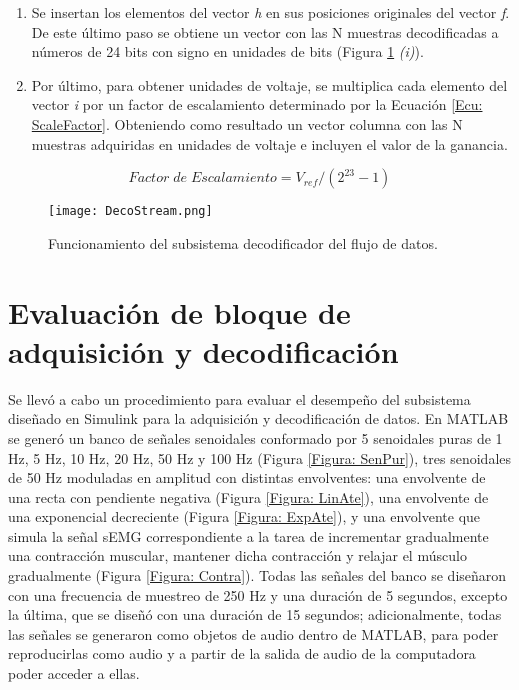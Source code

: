 \begin{enumerate}
	\item Se insertan los elementos del vector \emph{h} en sus posiciones originales del vector \emph{f}. De este último paso se obtiene un vector con las N muestras decodificadas a números de 24 bits con signo en unidades de bits (Figura \ref{Figura: DecoStream} \emph{(i)}).
	
	\item Por último, para  obtener unidades de voltaje, se multiplica cada elemento del vector \emph{i} por un factor de escalamiento determinado por la Ecuación \ref{Ecu: ScaleFactor}. Obteniendo como resultado un vector columna con las N muestras adquiridas en unidades de voltaje e incluyen el valor de la ganancia.
\end{enumerate}

\vfill
\begin{equation}
	Factor\; de\; Escalamiento = V_{ref}/(2^{23}-1)
	\label{Ecu: ScaleFactor}
\end{equation}
\vfill

\begin{figure}[htbb]
\centering
	\texttt{[image: DecoStream.png]}
	\caption{Funcionamiento del subsistema decodificador del flujo de datos.}
	\label{Figura: DecoStream}
\end{figure}
\vfill

\newpage
\section{Evaluación de bloque de adquisición y decodificación}\label{Sec: EvalAdquisicion}
Se llevó a cabo un procedimiento para evaluar el desempeño del subsistema diseñado en Simulink\textregistered \; para la adquisición y decodificación de datos. En MATLAB\textregistered \; se generó un banco de señales senoidales conformado por 5 senoidales puras de 1 Hz, 5 Hz, 10 Hz, 20 Hz, 50 Hz y 100 Hz (Figura \ref{Figura: SenPur}), tres senoidales de 50 Hz moduladas en amplitud con distintas envolventes: 
una envolvente de una recta con pendiente negativa (Figura \ref{Figura: LinAte}), una envolvente de una exponencial decreciente (Figura \ref{Figura: ExpAte}), y una envolvente que simula la señal sEMG correspondiente a la tarea de incrementar gradualmente una contracción muscular, mantener dicha contracción y relajar el músculo gradualmente (Figura \ref{Figura: Contra}). Todas las señales del banco se diseñaron con una frecuencia de muestreo de 250 Hz y una duración de 5 segundos, excepto la última, que se diseñó con una duración de 15 segundos; adicionalmente, todas las señales se generaron como objetos de audio dentro de MATLAB\textregistered, para poder reproducirlas como audio y a partir de la salida de audio de la computadora poder acceder a ellas.

